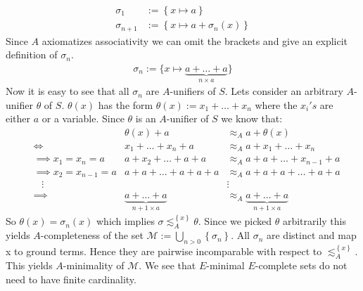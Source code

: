 \begin{align*}
	\sigma_1     & :=\left\lbrace x\mapsto a\right\rbrace             \\
	\sigma_{n+1} & :=\left\lbrace x\mapsto a+\sigma_n(x)\right\rbrace 
\end{align*}
Since $A$ axiomatizes associativity we can omit the brackets and give an explicit definition of $\sigma_n$.
\begin{align*}
	\sigma_n:=\lbrace x\mapsto\underbrace{a+\dots+a}_{n\times a} \rbrace 
\end{align*}
Now it is easy to see that all $\sigma_n$ are $A$-unifiers of $S$.
Lets consider an arbitrary $A$-unifier $\theta$ of $S$. $\theta(x)$ has the form $\theta(x):=x_1+\dots+x_n$ where the $x_i's$ are either $a$ or a variable.
Since $\theta$ is an $A$-unifier of $S$ we know that:
\begin{align*}
	  &                          & \theta(x)+a                          & \approx_A a+\theta(x)                          \\
	  & \iff                         & x_1+\dots+x_n+a                      & \approx_A a+x_1+\dots+x_n                      \\
	  & \implies x_1=x_n=a     & a+x_2+\dots+a+a              & \approx_A a+a+\dots+x_{n-1}+a              \\
	  & \implies x_2=x_{n-1}=a & a+a+\dots+a+a+a                      & \approx_A a+a+a+\dots+a+a                      \\
	  & \hspace{10pt}\vdots      &                                      & \vdots                                         \\
	  & \implies                 & \underbrace{a+\dots+a}_{n+1\times a} & \approx_A \underbrace{a+\dots+a}_{n+1\times a} 
\end{align*}
So $\theta(x)=\sigma_n(x)$ which implies $\sigma\lesssim^{\left\lbrace x\right\rbrace }_A\theta$.
Since we picked $\theta$ arbitrarily this yields $A$-completeness of the set $\mathcal{M}:=\bigcup_{n>0}\left\lbrace  \sigma_n\right\rbrace $.
All $\sigma_n$ are distinct and map x to ground terms. Hence they are pairwise incomparable with respect to $\lesssim^{\left\lbrace x\right\rbrace }_A$. This yields $A$-minimality of $\mathcal{M}$.
We see that $E$-minimal $E$-complete sets do not need to have finite cardinality.\\

